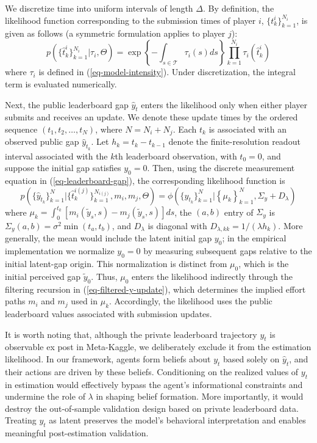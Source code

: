 \documentclass[mnsc]{informs3}
\begin{document}
We discretize time into uniform intervals of length $\Delta$.
By definition, the likelihood function corresponding to the submission times of player $i$, $\{t^i_k\}_{k=1}^{N_i}$, is given as follows (a symmetric formulation applies to player $j$):
\begin{equation}\label{eq-ihpp-prob}
p\left(\{\hat{t}^i_k\}_{k=1}^{N_i} | \tau_i, \Theta\right) = \exp\left\{-\int_{s\in\mathcal{T}}\tau_i(s)ds\right\}\prod_{k=1}^{N_i}\tau_i(\hat{t}^i_k)
\end{equation}
where $\tau_i$ is defined in (\ref{eq-model-intensity}).
Under discretization, the integral term is evaluated numerically.

Next, the public leaderboard gap $\hat y_t$ enters the likelihood only when either player submits and receives an update.
We denote these update times by the ordered sequence $(t_1,t_2,\ldots,t_N)$, where $N=N_i+N_j$.
Each $t_k$ is associated with an observed public gap $\hat{y}_{t_k}$.
Let $h_k=t_k-t_{k-1}$ denote the finite-resolution readout interval associated with the $k$th leaderboard observation, with $t_0=0$, and suppose the initial gap satisfies $y_0 = 0$.
Then, using the discrete measurement equation in (\ref{eq-leaderboard-gap}), the corresponding likelihood function is
\begin{equation}\label{eq-obs_gap-prob}
p\left(\{\hat{y}_{t_k}\}_{k=1}^N | \{\hat{t}^{i(j)}_k\}_{k=1}^{N_{i(j)}}, m_i, m_j, \Theta\right) =
\phi\left(\{\hat{y}_{t_k}\}_{k=1}^N | \left\{\mu_k\right\}^N_{k=1}, \Sigma_y+D_\lambda\right)
\end{equation}
where $\mu_k = \int_{0}^{t_{k}}\left[m_i(\tilde{y}_s, s) - m_j(\tilde{y}_s, s)\right]ds$, the $(a,b)$ entry of $\Sigma_y$ is $\Sigma_y(a,b)=\sigma^2\min(t_a,t_b)$, and $D_\lambda$ is diagonal with $D_{\lambda,kk}=1/(\lambda h_k)$.
More generally, the mean would include the latent initial gap $y_0$; in the empirical implementation we normalize $y_0=0$ by measuring subsequent gaps relative to the initial latent-gap origin.
This normalization is distinct from $\mu_0$, which is the initial perceived gap $\tilde y_0$.
Thus, $\mu_0$ enters the likelihood indirectly through the filtering recursion in (\ref{eq-filtered-y-update}), which determines the implied effort paths $m_i$ and $m_j$ used in $\mu_k$.
Accordingly, the likelihood uses the public leaderboard values associated with submission updates.

It is worth noting that, although the private leaderboard trajectory $y_t$ is observable ex post in Meta-Kaggle, we deliberately exclude it from the estimation likelihood.
In our framework, agents form beliefs about $y_t$ based solely on $\hat{y}_t$, and their actions are driven by these beliefs.
Conditioning on the realized values of $y_t$ in estimation would effectively bypass the agent’s informational constraints and undermine the role of $\lambda$ in shaping belief formation.
More importantly, it would destroy the out-of-sample validation design based on private leaderboard data.
Treating $y_t$ as latent preserves the model’s behavioral interpretation and enables meaningful post-estimation validation.
\end{document}
